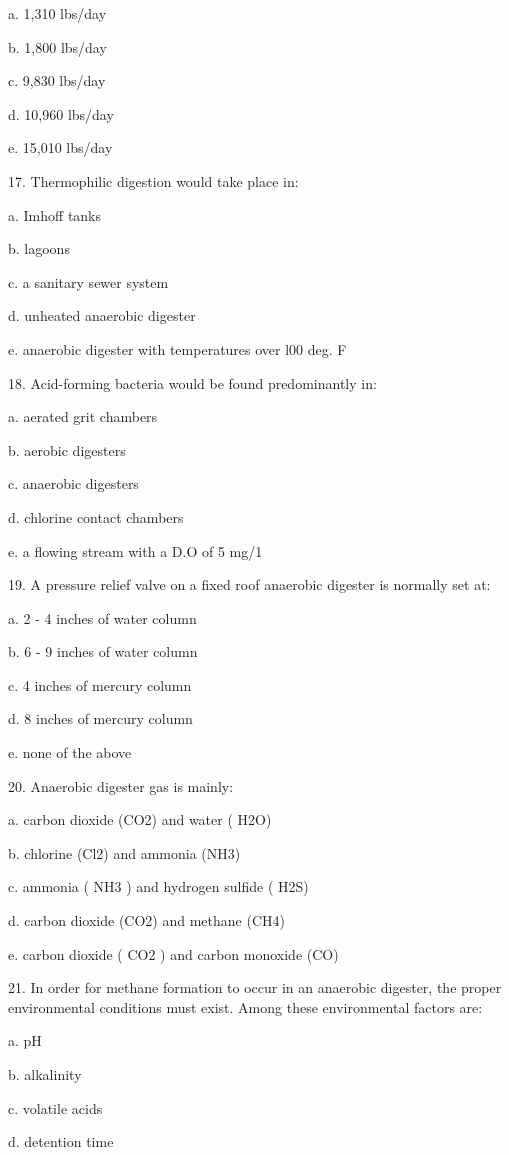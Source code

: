 \documentclass{article}
\begin{document}
a. 1,310 lbs/day 

b. 1,800 lbs/day 

c. 9,830 lbs/day 

d. 10,960 lbs/day 

e. 15,010 lbs/day 


17. Thermophilic digestion would take place in: 

a. Imhoff tanks 

b. lagoons 

c. a sanitary sewer system 

d. unheated anaerobic digester 

e. anaerobic digester with temperatures over l00 deg. F 


18. Acid-forming bacteria would be found predominantly in: 

a. aerated grit chambers 

b. aerobic digesters 

c. anaerobic digesters 

d. chlorine contact chambers 

e. a flowing stream with a D.O of 5 mg/1 


19. A pressure relief valve on a fixed roof anaerobic digester is normally set at: 

a. 2 - 4 inches of water column 

b. 6 - 9 inches of water column 

c. 4 inches of mercury column 

d. 8 inches of mercury column 

e. none of the above 


20. Anaerobic digester gas is mainly: 

a. carbon dioxide (CO2) and water ( H2O) 

b. chlorine (Cl2) and ammonia (NH3) 

c. ammonia ( NH3 ) and hydrogen sulfide ( H2S) 

d. carbon dioxide (CO2) and methane (CH4) 

e. carbon dioxide ( CO2 ) and carbon monoxide (CO) 


21. In order for methane formation to occur in an anaerobic digester, the proper environmental conditions must exist. Among these environmental factors are: 

a. pH 

b. alkalinity 

c. volatile acids 

d. detention time 
\end{document}
